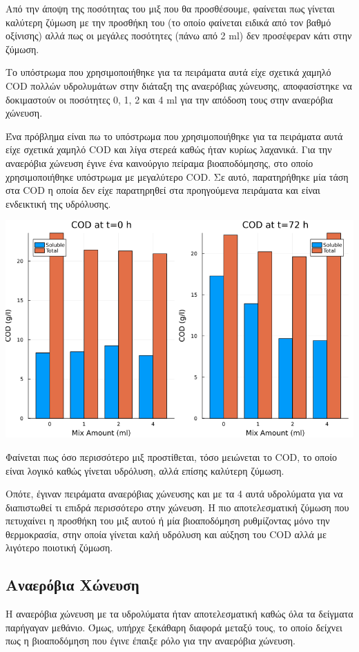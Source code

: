 \documentclass[11pt]{article}
\begin{document}
Από την άποψη της ποσότητας του μιξ που θα προσθέσουμε, φαίνεται πως γίνεται καλύτερη ζύμωση με την προσθήκη του (το οποίο φαίνεται ειδικά από τον βαθμό οξίνισης) αλλά πως οι μεγάλες ποσότητες (πάνω από 2 ml) δεν προσέφεραν κάτι στην ζύμωση.

Το υπόστρωμα που χρησιμοποιήθηκε για τα πειράματα αυτά είχε σχετικά χαμηλό COD πολλών υδρολυμάτων στην διάταξη της αναερόβιας χώνευσης, αποφασίστηκε να δοκιμαστούν οι ποσότητες 0, 1, 2 και 4 ml για την απόδοση τους στην αναερόβια χώνευση.

Ένα πρόβλημα είναι πω το υπόστρωμα που χρησιμοποιήθηκε για τα πειράματα αυτά είχε σχετικά χαμηλό COD και λίγα στερεά καθώς ήταν κυρίως λαχανικά. Για την αναερόβια χώνευση έγινε ένα καινούργιο πείραμα βιοαποδόμησης, στο οποίο χρησιμοποιήθηκε υπόστρωμα με μεγαλύτερο COD. Σε αυτό, παρατηρήθηκε μία τάση στα COD η οποία δεν είχε παρατηρηθεί στα προηγούμενα πειράματα και είναι ενδεικτική της υδρόλυσης.

\begin{center}
\includegraphics[width=.9\linewidth]{../plots/26_03/complete_cod_bar_26_03.png}
\end{center}

Φαίνεται πως όσο περισσότερο μιξ προστίθεται, τόσο μειώνεται το COD, το οποίο είναι λογικό καθώς γίνεται υδρόλυση, αλλά επίσης καλύτερη ζύμωση. 

Οπότε, έγιναν πειράματα αναερόβιας χώνευσης και με τα 4 αυτά υδρολύματα για να διαπιστωθεί τι επιδρά περισσότερο στην χώνευση. Η πιο αποτελεσματική ζύμωση που πετυχαίνει η προσθήκη του μιξ αυτού ή μία βιοαποδόμηση ρυθμίζοντας μόνο την θερμοκρασία, στην οποία γίνεται καλή υδρόλυση και αύξηση του COD αλλά με λιγότερο ποιοτική ζύμωση.

\subsection{Αναερόβια Χώνευση}
\label{sec:org23c2e1f}
Η αναερόβια χώνευση με τα υδρολύματα ήταν αποτελεσματική καθώς όλα τα δείγματα παρήγαγαν μεθάνιο. Όμως, υπήρχε ξεκάθαρη διαφορά μεταξύ τους, το οποίο δείχνει πως η βιοαποδόμηση που έγινε έπαιξε ρόλο για την αναερόβια χώνευση.
\end{document}
